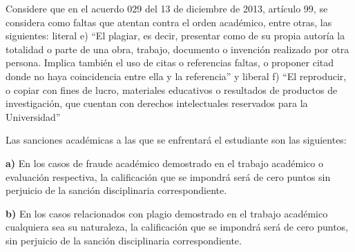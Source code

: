 \documentclass[12pt,letterpaper]{article}
\begin{document}
Considere que en el acuerdo 029 del 13 de diciembre de 2013, artículo 99, se considera como faltas que atentan contra el orden académico, entre otras, las siguientes: literal e) ``El plagiar, es decir, presentar como de su propia autoría la totalidad o parte de una obra, trabajo, documento o invención realizado por otra persona. Implica también el uso de citas o referencias faltas, o proponer citad donde no haya coincidencia entre ella y la referencia'' y liberal f) ``El reproducir, o copiar con fines de lucro, materiales educativos o resultados de productos de investigación, que cuentan con derechos intelectuales reservados para la Universidad''

Las sanciones académicas a las que se enfrentará el estudiante son las siguientes:

\textbf{a)} En los casos de fraude académico demostrado en el trabajo académico o evaluación respectiva, la calificación que se impondrá será de cero puntos sin perjuicio de la sanción disciplinaria correspondiente.

\textbf{b)} En los casos relacionados con plagio demostrado en el trabajo académico cualquiera sea su naturaleza, la calificación que se impondrá será de cero puntos, sin perjuicio de la sanción disciplinaria correspondiente.
\end{document}
